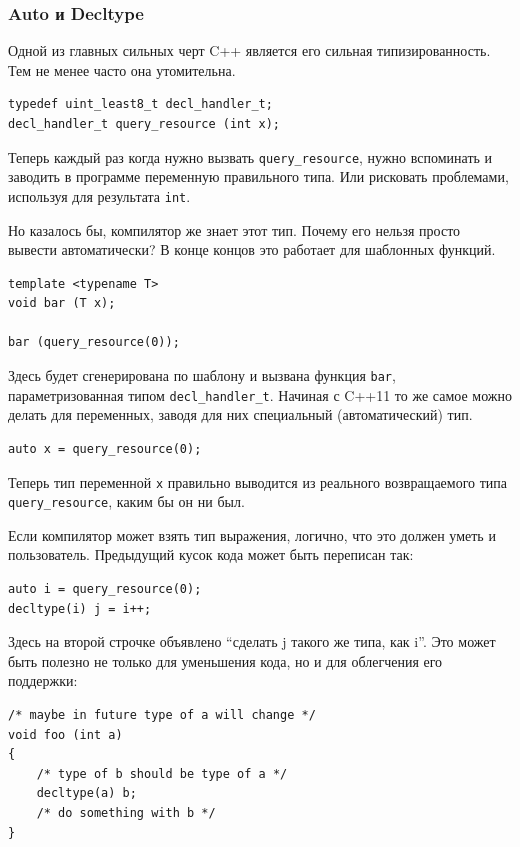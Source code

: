 \documentclass[a4paper,12pt,oneside]{article}
\begin{document}
\subsubsection{Auto и Decltype}\label{DecltypeAuto}

Одной из главных сильных черт C++ является его сильная типизированность. Тем не менее часто она утомительна. 

\begin{lstlisting}
typedef uint_least8_t decl_handler_t;
decl_handler_t query_resource (int x);
\end{lstlisting}

Теперь каждый раз когда нужно вызвать \lstinline!query_resource!, нужно вспоминать и заводить в программе переменную правильного типа. Или рисковать проблемами, используя для результата \lstinline!int!.

Но казалось бы, компилятор же знает этот тип. Почему его нельзя просто вывести автоматически? В конце концов это работает для шаблонных функций.

\begin{lstlisting}
template <typename T> 
void bar (T x);

bar (query_resource(0));
\end{lstlisting}

Здесь будет сгенерирована по шаблону и вызвана функция \lstinline!bar!, параметризованная типом \lstinline!decl_handler_t!. Начиная с C++11 то же самое можно делать для переменных, заводя для них специальный (автоматический) тип.

\begin{lstlisting}
auto x = query_resource(0);
\end{lstlisting}

Теперь тип переменной \lstinline!x! правильно выводится из реального возвращаемого типа \lstinline!query_resource!, каким бы он ни был.

Если компилятор может взять тип выражения, логично, что это должен уметь и пользователь. Предыдущий кусок кода может быть переписан так:

\begin{lstlisting}
auto i = query_resource(0);
decltype(i) j = i++;
\end{lstlisting}

Здесь на второй строчке объявлено ``сделать j такого же типа, как i''. Это может быть полезно не только для уменьшения кода, но и для облегчения его поддержки:

\begin{lstlisting}
/* maybe in future type of a will change */
void foo (int a)
{
    /* type of b should be type of a */
    decltype(a) b;
    /* do something with b */
}
\end{lstlisting}
\end{document}
